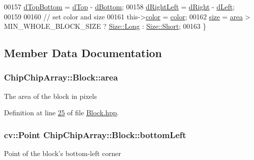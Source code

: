 \begin{DoxyCode}
00157         \hyperlink{classChipChipArray_1_1Block_a5b6e72665d0de840a123717e24ca5cf9}{dTopBottom} = \hyperlink{classChipChipArray_1_1Block_a4e792a05f677eafbeb9439a9e631c255}{dTop} - \hyperlink{classChipChipArray_1_1Block_af3c4ecd0fd36763ac85c2dc0b57b8359}{dBottom};
00158         \hyperlink{classChipChipArray_1_1Block_a2d02c7b99ca656960fc9724587791999}{dRightLeft} = \hyperlink{classChipChipArray_1_1Block_a6a4b0aa6aae7e41d836c8955e209c16e}{dRight} - \hyperlink{classChipChipArray_1_1Block_aca89dc06d62feb9a6478a06976171b2b}{dLeft};
00159 
00160         \textcolor{comment}{// set color and size}
00161         this->\hyperlink{classChipChipArray_1_1Block_a262210a9a04028f3f2670c9ae38ef3d7}{color} = \hyperlink{classChipChipArray_1_1Block_a262210a9a04028f3f2670c9ae38ef3d7}{color};
00162         \hyperlink{classChipChipArray_1_1Block_aebd356d7fcfe7ff11db8195e6d7f8e42}{size} = \hyperlink{classChipChipArray_1_1Block_ab5f9a9c1cc11e949685f8ad3d52599b2}{area} > MIN\_WHOLE\_BLOCK\_SIZE ? \hyperlink{definitions_8hpp_a9809446fd16a744b6df9808293f14153a8394f0347c184cf156ac5924dccb773b}{Size::Long} : 
      \hyperlink{definitions_8hpp_a9809446fd16a744b6df9808293f14153a30bb747c98bccdd11b3f89e644c4d0ad}{Size::Short};
00163     \}
\end{DoxyCode}


\subsection{Member Data Documentation}
\hypertarget{classChipChipArray_1_1Block_ab5f9a9c1cc11e949685f8ad3d52599b2}{
\subsubsection[{area}]{ Chip\+Chip\+Array\+::\+Block\+::area}}\label{classChipChipArray_1_1Block_ab5f9a9c1cc11e949685f8ad3d52599b2}
The area of the block in pixels 

Definition at line \hyperlink{Block_8hpp_source_l00025}{25} of file \hyperlink{Block_8hpp_source}{Block.\+hpp}.

\hypertarget{classChipChipArray_1_1Block_a78304b597a8d8a74a4d9b4bb561a7224}{
\subsubsection[{bottom\+Left}]{\setlength{\rightskip}{0pt plus 5cm}cv\+::\+Point Chip\+Chip\+Array\+::\+Block\+::bottom\+Left}}\label{classChipChipArray_1_1Block_a78304b597a8d8a74a4d9b4bb561a7224}
Point of the block's bottom-\/left corner 


